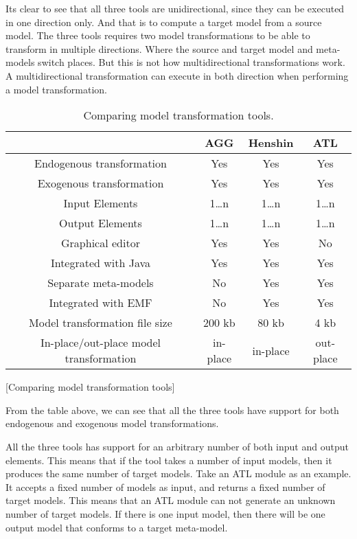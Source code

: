 Its clear to see that all three tools are unidirectional, since they can be
executed in one direction only. And that is to compute a target model from a
source model. The three tools requires two model transformations to be able to
transform in multiple directions. Where the source and target model and
meta-models switch places. But this is not how multidirectional transformations
work. A multidirectional transformation can execute in both direction when
performing a model transformation.

\begin{table}[ht]
\centering
\begin{tabular}{| c | c | c | c |}
\hline
 & AGG & Henshin & ATL \\
\hline
Endogenous transformation & \cellcolor{green!25}Yes &
\cellcolor{green!25}Yes & \cellcolor{green!25}Yes \\

Exogenous transformation & \cellcolor{green!25}Yes &
\cellcolor{green!25}Yes & \cellcolor{green!25}Yes \\

Input Elements & 1\ldots n & 1\ldots n & 1\ldots n\\
Output Elements & 1\ldots n & 1\ldots n & 1\ldots n\\
Graphical editor &\cellcolor{green!25}Yes &
\cellcolor{green!25}Yes &\cellcolor{red!25}No  \\
Integrated with Java & \cellcolor{green!25}Yes &
\cellcolor{green!25}Yes & \cellcolor{green!25}Yes \\
Separate meta-models & \cellcolor{red!25}No &
\cellcolor{green!25}Yes & \cellcolor{green!25}Yes \\
Integrated with EMF & \cellcolor{red!25}No &
\cellcolor{green!25}Yes & \cellcolor{green!25}Yes \\
Model transformation file size &200 kb &80 kb &4 kb \\
In-place/out-place model transformation &in-place &
in-place &out-place \\
\hline

\end{tabular}
[Comparing model transformation tools]
\caption{Comparing model transformation tools.}
\end{table}

\newpage

From the table above, we can see that all the three tools have support
for both endogenous and exogenous model transformations. 

All the three tools has support for an arbitrary number of both input and
output elements. This means that if the tool takes a number of input models, then it
produces the same number of target models. Take an ATL module as an example. It
accepts a fixed number of models as input, and returns a fixed number of target
models. This means that an ATL module can not generate an unknown number of
target models. If there is one input model, then there will be one output model
that conforms to a target meta-model.


